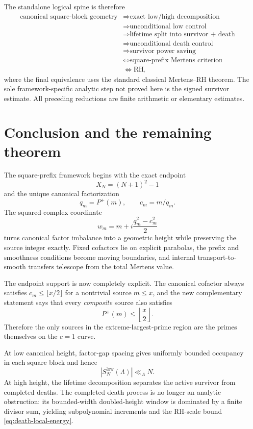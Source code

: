 \documentclass[11pt]{article}
\theoremstyle{definition}
\newcommand{\Pplus}{P^{+}}
\newcommand{\1}{\mathbf{1}}
\begin{document}
The standalone logical spine is therefore
\[
 \begin{aligned}
 \text{canonical square-block geometry}
 &\Longrightarrow \text{exact low/high decomposition}\\
 &\Longrightarrow \text{unconditional low control}\\
 &\Longrightarrow \text{lifetime split into survivor + death}\\
 &\Longrightarrow \text{unconditional death control}\\
 &\Longrightarrow \text{survivor power saving}\\
 &\Longleftrightarrow \text{square-prefix Mertens criterion}\\
 &\Longleftrightarrow \mathrm{RH},
 \end{aligned}
\]
where the final equivalence uses the standard classical Mertens--RH theorem.  The sole framework-specific analytic step not proved here is the signed survivor estimate.  All preceding reductions are finite arithmetic or elementary estimates.

\section{Conclusion and the remaining theorem}
\label{sec:conclusion}

The square-prefix framework begins with the exact endpoint
\[
 X_N=(N+1)^2-1
\]
and the unique canonical factorization
\[
 q_m=\Pplus(m),\qquad c_m=m/q_m.
\]
The squared-complex coordinate
\[
 w_m=m+i\frac{q_m^2-c_m^2}{2}
\]
turns canonical factor imbalance into a geometric height while preserving the source integer exactly.  Fixed cofactors lie on explicit parabolas, the prefix and smoothness conditions become moving boundaries, and internal transport-to-smooth transfers telescope from the total Mertens value.

The endpoint support is now completely explicit.  The canonical cofactor always satisfies $c_m\le\lfloor x/2\rfloor$ for a nontrivial source $m\le x$, and the new complementary statement says that every \emph{composite} source also satisfies
\[
 \Pplus(m)\le\left\lfloor\frac{x}{2}\right\rfloor.
\]
Therefore the only sources in the extreme-largest-prime region are the primes themselves on the $c=1$ curve.

At low canonical height, factor-gap spacing gives uniformly bounded occupancy in each square block and hence
\[
 |S_N^{\mathrm{low}}(\Lambda)|\ll_\Lambda N.
\]
At high height, the lifetime decomposition separates the active survivor from completed deaths.  The completed death process is no longer an analytic obstruction: its bounded-width doubled-height window is dominated by a finite divisor sum, yielding subpolynomial increments and the RH-scale bound \cref{eq:death-local-energy}.
\end{document}
